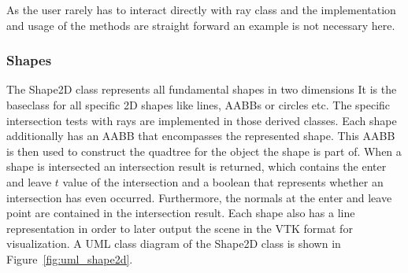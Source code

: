 \documentclass[a4paper,10pt]{article}
\newcommand{\figref}[1]{Figure~\ref{#1}}
\begin{document}
    As the user rarely has to interact directly with ray class and
    the implementation and usage of the methods are straight forward
    an example is not necessary here.
    
    \subsubsection{Shapes}

    The Shape2D class represents all fundamental shapes in two dimensions
    It is the baseclass for all specific 2D shapes like lines, AABBs or circles
    etc.
    The specific intersection tests with rays are implemented in those derived
    classes.
    Each shape additionally has an AABB that encompasses the represented
    shape.
    This AABB is then used to construct the quadtree for the object the shape
    is part of.
    When a shape is intersected an intersection result is returned, which
    contains the enter and leave $t$ value of the intersection and a boolean
    that represents whether an intersection has even occurred.
    Furthermore, the normals at the enter and leave point are contained
    in the intersection result.
    Each shape also has a line representation in order to later output
    the scene in the VTK format for visualization.
    A UML class diagram of the Shape2D class is shown in 
    \figref{fig:uml_shape2d}.
\end{document}
